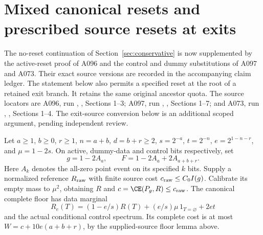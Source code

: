 \section{Mixed canonical resets and prescribed source resets at exits}
\label{sec:mixedexits}
The no-reset continuation of Section~\ref{sec:conservative} is now
supplemented by the active-reset proof of A096 and the control and
dummy substitutions of A097 and A073. Their exact source versions
are recorded in the accompanying claim ledger. The statement below
also permits a specified reset at the root of a retained exit branch.
It retains the same original ancestor quota.
The source locators are A096, run
,
, Sections 1--3; A097, run
,
, Sections 1--7; and A073, run
,
, Sections 1--4. The exit-source conversion
below is an additional scoped argument, pending independent review.

Let $a\ge1$, $b\ge0$, $r\ge1$, $n=a+b$, $d=b+r\ge2$,
$s=2^{-a}$, $t=2^{-n}$, $e=2^{1-n-r}$, and $\mu=1-2s$.
On active, dummy-data and control bits respectively, set
\[
 g=1-2A_a,\qquad F=1-2A_a+2A_{a+b+r}.
\]
Here $A_k$ denotes the all-zero point event on its specified $k$ bits.
Supply a normalized reference $R_{\rm raw}$ with finite source cost
$c_{\rm raw}\le C_0 I(g)$. Calibrate its empty mass to $\mu^2$,
obtaining $R$ and $c=\CE(P_g,R)\le c_{\rm raw}$.
The canonical complete floor has data marginal
\[
 R_e(T)=(1-e/s)R(T)+(e/s)\mu\,1_{T=\varnothing}+2et
\]
and the actual conditional control spectrum. Its complete cost is
at most $W=c+10e(a+b+r)$, by the supplied-source floor lemma above.

